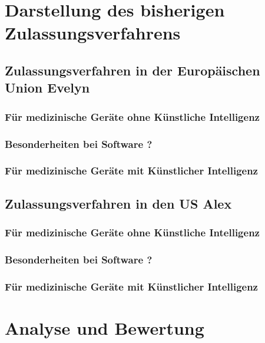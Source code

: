 \documentclass[a4paper, 11pt]{article}
\begin{document}
	\newpage
	\section{Darstellung des bisherigen Zulassungsverfahrens}\label{sec:admission}
		
		\subsection{Zulassungsverfahren in der Europäischen Union \small{Evelyn}}\label{sec:europe}
			
			\subsubsection{Für medizinische Geräte ohne Künstliche Intelligenz}\label{sec:europe-no-ai}
				
			\subsubsection{Besonderheiten bei Software \small{?}}\label{sec:europe-software}
				
			\subsubsection{Für medizinische Geräte mit Künstlicher Intelligenz}\label{sec:europe-with-ai}
				
		\subsection{Zulassungsverfahren in den US \small{Alex}}\label{sec:us}
			
			\subsubsection{Für medizinische Geräte ohne Künstliche Intelligenz}\label{sec:us-no-ai}
				
			\subsubsection{Besonderheiten bei Software \small{?}}\label{sec:us-software}
				
			\subsubsection{Für medizinische Geräte mit Künstlicher Intelligenz}\label{sec:us-with-ai}
				

	\newpage
	\section{Analyse und Bewertung}\label{sec:analysis}
		
\end{document}
